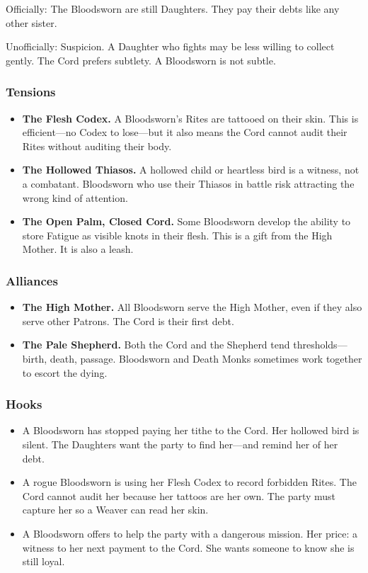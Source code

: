 Officially: The Bloodsworn are still Daughters. They pay their debts like any other sister.

Unofficially: Suspicion. A Daughter who fights may be less willing to collect gently. The Cord prefers subtlety. A Bloodsworn is not subtle.

\subsubsection{Tensions}

\begin{itemize}
\item \textbf{The Flesh Codex.} A Bloodsworn's Rites are tattooed on their skin. This is efficient—no Codex to lose—but it also means the Cord cannot audit their Rites without auditing their body.
\item \textbf{The Hollowed Thiasos.} A hollowed child or heartless bird is a witness, not a combatant. Bloodsworn who use their Thiasos in battle risk attracting the wrong kind of attention.
\item \textbf{The Open Palm, Closed Cord.} Some Bloodsworn develop the ability to store Fatigue as visible knots in their flesh. This is a gift from the High Mother. It is also a leash.
\end{itemize}

\subsubsection{Alliances}

\begin{itemize}
\item \textbf{The High Mother.} All Bloodsworn serve the High Mother, even if they also serve other Patrons. The Cord is their first debt.
\item \textbf{The Pale Shepherd.} Both the Cord and the Shepherd tend thresholds—birth, death, passage. Bloodsworn and Death Monks sometimes work together to escort the dying.
\end{itemize}

\subsubsection{Hooks}

\begin{itemize}
\item A Bloodsworn has stopped paying her tithe to the Cord. Her hollowed bird is silent. The Daughters want the party to find her—and remind her of her debt.
\item A rogue Bloodsworn is using her Flesh Codex to record forbidden Rites. The Cord cannot audit her because her tattoos are her own. The party must capture her so a Weaver can read her skin.
\item A Bloodsworn offers to help the party with a dangerous mission. Her price: a witness to her next payment to the Cord. She wants someone to know she is still loyal.
\end{itemize}

